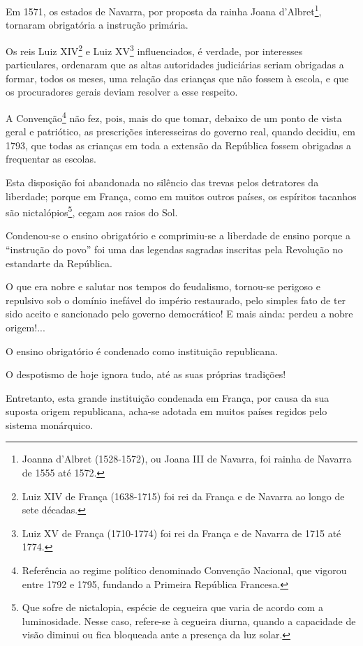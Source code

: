 Em 1571, os estados de Navarra, por proposta da rainha Joana
d'Albret\footnote{Joanna d'Albret (1528-1572), ou Joana III de
  Navarra, foi rainha de Navarra de 1555 até 1572.}, tornaram
obrigatória a instrução primária.

Os reis Luiz XIV\footnote{Luiz XIV de França (1638-1715) foi rei da
  França e de Navarra ao longo de sete décadas.} e Luiz XV\footnote{
  Luiz XV de França (1710-1774) foi rei da França e de Navarra de 1715
  até 1774.} influenciados, é verdade, por interesses particulares,
ordenaram que as altas autoridades judiciárias seriam obrigadas a
formar, todos os meses, uma relação das crianças que não fossem à
escola, e que os procuradores gerais deviam resolver a esse respeito.

A Convenção\footnote{Referência ao regime político denominado
  Convenção Nacional, que vigorou entre 1792 e 1795, fundando a Primeira
  República Francesa.} não fez, pois, mais do que tomar, debaixo de um
ponto de vista geral e patriótico, as prescrições interesseiras do
governo real, quando decidiu, em 1793, que todas as crianças em toda a
extensão da República fossem obrigadas a frequentar as escolas.

Esta disposição foi abandonada no silêncio das trevas pelos detratores
da liberdade; porque em França, como em muitos outros países, os
espíritos tacanhos são nictalópios\footnote{Que sofre de nictalopia,
  espécie de cegueira que varia de acordo com a luminosidade. Nesse
  caso, refere-se à cegueira diurna, quando a capacidade de visão
  diminui ou fica bloqueada ante a presença da luz solar.}, cegam aos
raios do Sol.

Condenou-se o ensino obrigatório e comprimiu-se a liberdade de ensino
porque a ``instrução do povo'' foi uma das legendas sagradas inscritas
pela Revolução no estandarte da República.

O que era nobre e salutar nos tempos do feudalismo, tornou-se perigoso e
repulsivo sob o domínio inefável do império restaurado, pelo simples
fato de ter sido aceito e sancionado pelo governo democrático! E mais
ainda: perdeu a nobre origem!...

O ensino obrigatório é condenado como instituição republicana.

O despotismo de hoje ignora tudo, até as suas próprias tradições!

Entretanto, esta grande instituição condenada em França, por causa da
sua suposta origem republicana, acha-se adotada em muitos países regidos
pelo sistema monárquico.

